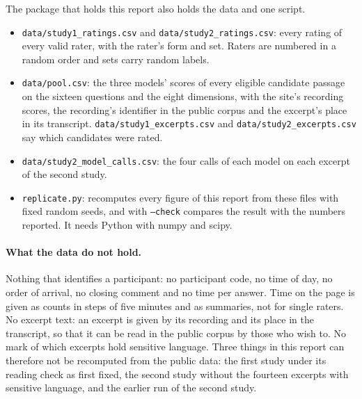 The package that holds this report also holds the data and one script.
\begin{itemize}
\item \texttt{data/study1\_ratings.csv} and \texttt{data/study2\_ratings.csv}: every rating of every valid
  rater, with the rater's form and set. Raters are numbered in a random order and sets carry random labels.
\item \texttt{data/pool.csv}: the three models' scores of every eligible candidate passage on the sixteen
  questions and the eight dimensions, with the site's recording scores, the recording's identifier in the public corpus and the excerpt's place in
  its transcript. \texttt{data/study1\_excerpts.csv} and \texttt{data/study2\_excerpts.csv} say which
  candidates were rated.
\item \texttt{data/study2\_model\_calls.csv}: the four calls of each model on each excerpt of the second study.
\item \texttt{replicate.py}: recomputes every figure of this report from these files with fixed random seeds,
  and with \texttt{--check} compares the result with the numbers reported. It needs Python with numpy and scipy.
\end{itemize}

\paragraph{What the data do not hold.} Nothing that identifies a participant: no participant code, no time of
day, no order of arrival, no closing comment and no time per answer. Time on the page is given as counts in
steps of five minutes and as summaries, not for single raters. No excerpt text: an excerpt is given by its
recording and its place in the transcript, so that it can be read in the public corpus by those who wish to. No
mark of which excerpts hold sensitive language. Three things in this report can therefore not be recomputed
from the public data: the first study under its reading check as first fixed, the second study without the
fourteen excerpts with sensitive language, and the earlier run of the second study.
